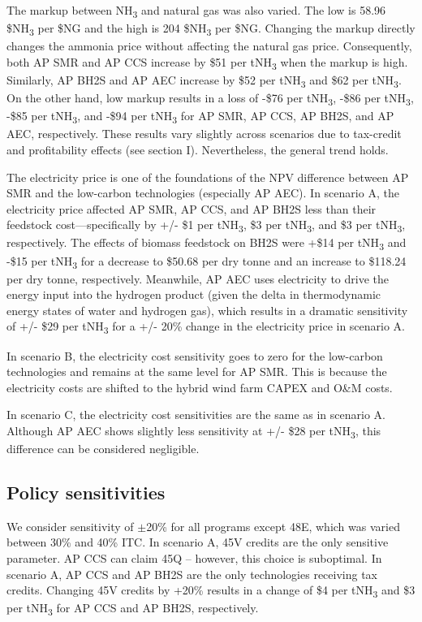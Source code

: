 \documentclass{article}
\begin{document}
The markup between NH\textsubscript{3} and natural gas was also varied. The low is 58.96 \$NH\textsubscript{3} per \$NG and the high is 204 \$NH\textsubscript{3} per \$NG. Changing the markup directly changes the ammonia price without affecting the natural gas price. Consequently, both AP SMR and AP CCS increase by \$51 per tNH\textsubscript{3} when the markup is high. Similarly, AP BH2S and AP AEC increase by \$52 per tNH\textsubscript{3} and \$62 per tNH\textsubscript{3}. On the other hand, low markup results in a loss of -\$76 per tNH\textsubscript{3}, -\$86 per tNH\textsubscript{3}, -\$85 per tNH\textsubscript{3}, and -\$94 per tNH\textsubscript{3} for AP SMR, AP CCS, AP BH2S, and AP AEC, respectively. These results vary slightly across scenarios due to tax-credit and profitability effects (see section I). Nevertheless, the general trend holds.

The electricity price is one of the foundations of the NPV difference between AP SMR and the low-carbon technologies (especially AP AEC). In scenario A, the electricity price affected AP SMR, AP CCS, and AP BH2S less than their feedstock cost—specifically by +/- \$1 per tNH\textsubscript{3}, \$3 per tNH\textsubscript{3}, and \$3 per tNH\textsubscript{3}, respectively. The effects of biomass feedstock on BH2S were +\$14 per tNH\textsubscript{3} and -\$15 per tNH\textsubscript{3} for a decrease to \$50.68 per dry tonne and an increase to \$118.24 per dry tonne, respectively. Meanwhile, AP AEC uses electricity to drive the energy input into the hydrogen product (given the delta in thermodynamic energy states of water and hydrogen gas), which results in a dramatic sensitivity of +/- \$29 per tNH\textsubscript{3} for a +/- 20\% change in the electricity price in scenario A.

In scenario B, the electricity cost sensitivity goes to zero for the low-carbon technologies and remains at the same level for AP SMR. This is because the electricity costs are shifted to the hybrid wind farm CAPEX and O\&M costs.

In scenario C, the electricity cost sensitivities are the same as in scenario A. Although AP AEC shows slightly less sensitivity at +/- \$28 per tNH\textsubscript{3}, this difference can be considered negligible.

\subsection{Policy sensitivities}

We consider sensitivity of $\pm$20\% for all programs except 48E, which was varied between 30\% and 40\% ITC. In scenario A, 45V credits are the only sensitive parameter. AP CCS can claim 45Q – however, this choice is suboptimal. In scenario A, AP CCS and AP BH2S are the only technologies receiving tax credits. Changing 45V credits by +20\% results in a change of \$4 per tNH\textsubscript{3} and \$3 per tNH\textsubscript{3} for AP CCS and AP BH2S, respectively.
\end{document}
